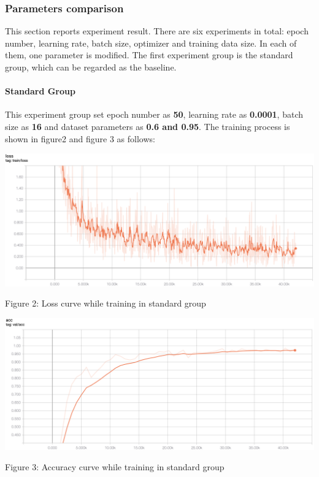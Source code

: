 \documentclass[11pt]{article}
\begin{document}
    \hypertarget{parameters-comparison}{%
\subsubsection{Parameters comparison}\label{parameters-comparison}}

This section reports experiment result. There are six experiments in
total: epoch number, learning rate, batch size, optimizer and training
data size. In each of them, one parameter is modified. The first
experiment group is the standard group, which can be regarded as the
baseline.

    \hypertarget{standard-group}{%
\paragraph{Standard Group}\label{standard-group}}

This experiment group set epoch number as \textbf{50}, learning rate as
\textbf{0.0001}, batch size as \textbf{16} and dataset parameters as
\textbf{0.6 and 0.95}. The training process is shown in figure2 and
figure 3 as follows:

    \includegraphics{../pics/SG_1.png}

Figure 2: Loss curve while training in standard group

\includegraphics{../pics/SG_2.png}

Figure 3: Accuracy curve while training in standard group
\end{document}
